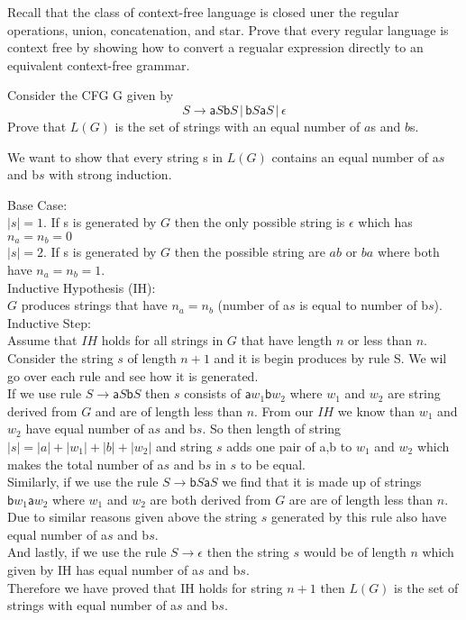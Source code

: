 \documentclass[12pt]{exam}
\begin{document}
\begin{questions}
\begin{solution}
  \end{solution}


  \question{} Recall that the class of context-free language is closed uner the regular operations, union, concatenation, and star. Prove that every regular language is context free by showing how to convert a regualar expression directly to an equivalent context-free grammar.


  \question{} Consider the CFG G given by
  \[S\to \mathsf{a}S\mathsf{b}S\,|\,\mathsf{b}S\mathsf{a}S\,|\,\epsilon\]
  Prove that $L(G)$ is the set of strings with an equal number of $a$s and $b$s.

  \begin{solution}

    We want to show that every string s in $L(G)$ contains an equal number of a$s$ and b$s$ with strong induction.

    Base Case:\\
    $|s| = 1$. If s is generated by $G$ then the only possible string is $\epsilon$ which has $n_{a}= n_{b}=0$\\
    $|s| = 2$. If s is generated by $G$ then the possible string are $ab$ or $ba$ where both have $n_{a} = n_{b} = 1$.\\
    Inductive Hypothesis (IH):\\
    $G$ produces strings that have $n_{a} = n_{b}$ (number of a$s$ is equal to number of b$s$).\\
    Inductive Step:\\
    Assume that $IH$ holds for all strings in $G$ that have length $n$ or less than $n$. Consider the string $s$ of length $n+1$ and it is begin produces by rule S. We wil go over each rule and see how it is generated.\\
    If we use rule $S\to \mathsf{a}S\mathsf{b}S$ then $s$ consists of $\mathsf{a}w_{1}\mathsf{b}w_{2}$ where $w_{1}$ and $w_{2}$ are string derived from $G$ and are of length less than $n$. From our $IH$ we know than $w_{1}$ and $w_{2}$ have equal number of a$s$ and b$s$. So then length of string $|s| = |a| + |w_{1}| + |b| + |w_{2}|$ and string $s$ adds one pair of a,b to $w_{1}$ and $w_{2}$ which makes the total number of a$s$ and b$s$ in $s$ to be equal.\\
    Similarly, if we use the rule $S\to \mathsf{b}S\mathsf{a}S$ we find that it is made up of strings $\mathsf{b}w_{1}\mathsf{a}w_{2}$ where $w_{1}$ and $w_{2}$ are both derived from $G$ are are of length less than $n$. Due to similar reasons given above the string $s$ generated by this rule also have equal number of a$s$ and b$s$.\\
    And lastly, if we use the rule $S\to \epsilon$ then the string $s$ would be of length $n$ which given by IH has equal number of a$s$ and b$s$.\\
    Therefore we have proved that IH holds for string $n+1$ then $L(G)$ is the set of strings with equal number of a$s$ and b$s$.
  \end{solution}



\end{questions}
\end{document}
